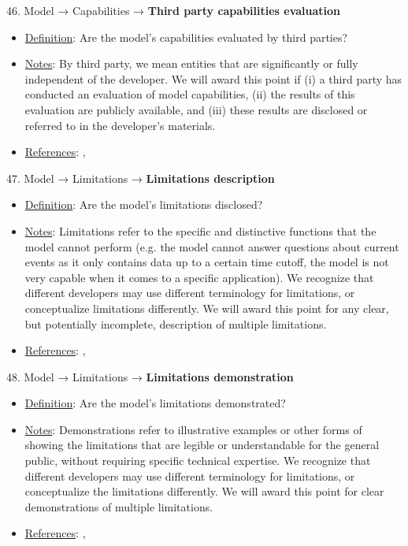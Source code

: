46. Model → Capabilities → \textbf{Third party capabilities evaluation}
\vspace{-\parskip}
\begin{itemize}
	\item
	\underline{Definition}: Are the model’s capabilities evaluated by third parties?
	\item
	\underline{Notes}: By third party, we mean entities that are significantly or fully independent of the developer. We will award this point if (i) a third party has conducted an evaluation of model capabilities, (ii) the results of this evaluation are publicly available, and (iii) these results are disclosed or referred to in the developer’s materials.
	\item
	\underline{References}: \citet{raji2022audit}, \citet{liang2022helm}
\end{itemize} \vspace{\baselineskip}


47. Model → Limitations → \textbf{Limitations description}
\vspace{-\parskip}
\begin{itemize}
	\item
	\underline{Definition}: Are the model's limitations disclosed?
	\item
	\underline{Notes}: Limitations refer to the specific and distinctive functions that the model cannot perform (e.g. the model cannot answer questions about current events as it only contains data up to a certain time cutoff, the model is not very capable when it comes to a specific application). We recognize that different developers may use different terminology for limitations, or conceptualize limitations differently. We will award this point for any clear, but potentially incomplete, description of multiple limitations.
	\item
	\underline{References}: \citet{raji2022fallacy}, \citet{liang2022helm}
\end{itemize} \vspace{\baselineskip}


48. Model → Limitations → \textbf{Limitations demonstration}
\vspace{-\parskip}
\begin{itemize}
	\item
	\underline{Definition}: Are the model’s limitations demonstrated?
	\item
	\underline{Notes}: Demonstrations refer to illustrative examples or other forms of showing the limitations that are legible or understandable for the general public, without requiring specific technical expertise. We recognize that different developers may use different terminology for limitations, or conceptualize the limitations differently. We will award this point for clear demonstrations of multiple limitations.
	\item
	\underline{References}: \citet{raji2022fallacy}, \citet{liang2022helm}
\end{itemize} \vspace{\baselineskip}


